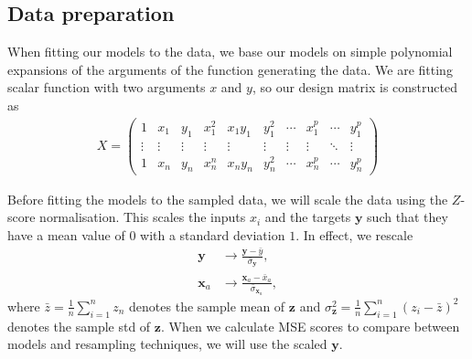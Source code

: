 \documentclass[twocolumn,english,notitlepage]{article}
\renewcommand{\vec}[1]{\boldsymbol{#1}}
\begin{document}
        \subsection{Data preparation}
            When fitting our models to the data, we base our models on simple polynomial expansions of the arguments of the function generating the data. We are fitting scalar function with two arguments $x$ and $y$, so our design matrix is constructed as
            \begin{align} \label{met:eq:design_X}
                X = \begin{pmatrix}
                    1 & x_1 & y_1 & x^2_1 & x_1y_1 & y_1^2 & \cdots & x_1^p & \cdots & y_1^p \\
                    \vdots & \vdots & \vdots & \vdots & \vdots & \vdots & \vdots & \vdots & \ddots & \vdots \\
                    1 & x_n & y_n & x^n_n & x_ny_n & y_n^2 & \cdots & x_n^p & \cdots & y_n^p
                \end{pmatrix}
            \end{align}
        
            Before fitting the models to the sampled data, we will scale the data using the $Z$-score normalisation. This scales the inputs $x_i$ and the targets $\vec{y}$ such that they have a mean value of $0$ with a standard deviation $1$. In effect, we rescale
            \begin{subequations}
                \begin{align}
                    \vec{y} &\to \frac{\vec{y}-\bar{y}}{\bar{\sigma}_{\vec{y}}}, \\
                    \vec{x}_a &\to \frac{\vec{x}_a - \bar{x}_a}{\bar{\sigma}_{\vec{x}_a}},
                \end{align}
            \end{subequations}
            where $\bar{z} = \frac{1}{n} \sum_{i=1}^n z_n$ denotes the sample mean of $\vec{z}$ and $\sigma_{\vec{z}}^2 = \frac{1}{n} \sum_{i=1}^n {(z_i-\bar{z})}^2$ denotes the sample std of $\vec{z}$. When we calculate MSE scores to compare between models and resampling techniques, we will use the scaled $\vec{y}$.
\end{document}
